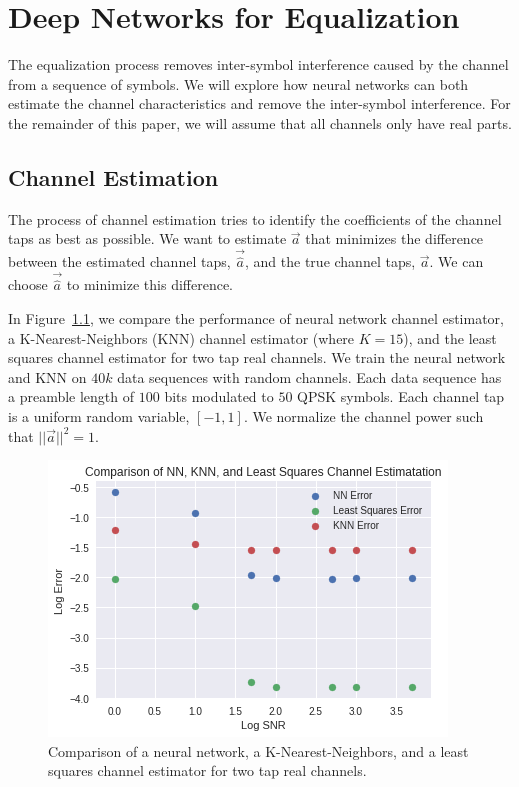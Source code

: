 \chapter[equal]{Deep Networks for Equalization\raisebox{.3\baselineskip}{\normalsize\footnotemark}}

The equalization process removes inter-symbol interference caused by the channel from a sequence of symbols.  We will explore how neural networks can both estimate the channel characteristics and remove the inter-symbol interference.  For the remainder of this paper, we will assume that all channels only have real parts. 

\section{Channel Estimation}

The process of channel estimation tries to identify the coefficients of the channel taps as best as possible.  We want to estimate $\vec{a}$ that minimizes the difference between the estimated channel taps, $\vec{\hat{a}}$, and the true channel taps, $\vec{a}$.  We can choose $\vec{\hat{a}}$ to minimize this difference.

In Figure~\ref{fig:chann_est}, we compare the performance of neural network channel estimator, a K-Nearest-Neighbors (KNN) channel estimator (where $K=15$), and the least squares channel estimator for two tap real channels.
We train the neural network and KNN on $40k$ data sequences with random channels.  Each data sequence has a preamble length of $100$ bits modulated to $50$ QPSK symbols.  
Each channel tap is a uniform random variable, $[-1,1]$.  We normalize the channel power such that $||\vec{a}||^2 = 1$.  

\begin{figure}
\begin{center}
\includegraphics{figures/equal/Channel_Estimation_KNN_LSTSQ_NN.png}
\caption{Comparison of a neural network, a K-Nearest-Neighbors, and a least squares channel estimator for two tap real channels.}
\label{fig:chann_est}
\end{center}
\end{figure}

